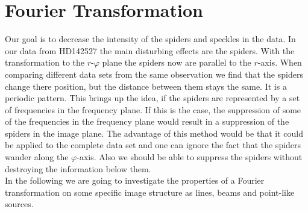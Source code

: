 \section{Fourier Transformation}
Our goal is to decrease the intensity of the spiders and speckles in the data. In our data from HD142527 the main disturbing effects are the spiders. With the transformation to the $r$-$\varphi$ plane the spiders now are parallel to the $r$-axis. When comparing different data sets from the same observation we find that the spiders change there position, but the distance between them stays the same. It is a periodic pattern. This brings up the idea, if the spiders are represented by a set of frequencies in the frequency plane. If this is the case, the suppression of some of the frequencies in the frequency plane would result in a suppression of the spiders in the image plane. The advantage of this method would be that it could be applied to the complete data set and one can ignore the fact that the spiders wander along the $\varphi$-axis. Also we should be able to suppress the spiders without destroying the information below them.\\
In the following we are going to investigate the properties of a Fourier transformation on some specific image structure as lines, beams and point-like sources.\\

